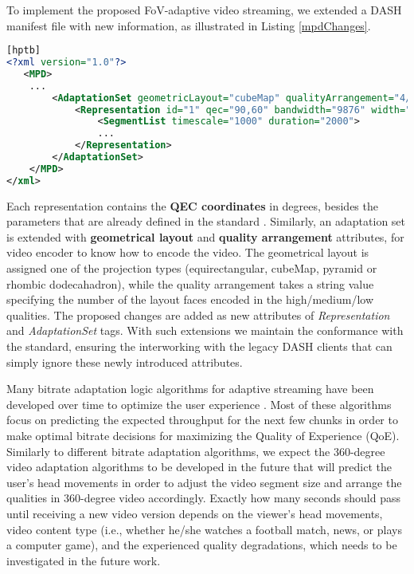  To implement the proposed FoV-adaptive video streaming, we extended a DASH manifest file with new information, as illustrated in Listing \ref{mpdChanges}.
\begin{lstlisting}[language=xml, frame=single, backgroundcolor=\color{white}, caption=Extensions of MPD file, label=mpdChanges][hptb]
<?xml version="1.0"?>
   <MPD>
    ...
        <AdaptationSet geometricLayout="cubeMap" qualityArrangement="4/1/1">
            <Representation id="1" qec="90,60" bandwidth="9876" width="1920" height="1080" frameRate="30">
                <SegmentList timescale="1000" duration="2000">
                ...
            </Representation>
        </AdaptationSet>
    </MPD>
</xml>
\end{lstlisting}
Each representation contains the \textbf{QEC coordinates} in degrees, besides the parameters that are already defined in the standard \cite{iso_iec}. Similarly, an adaptation set is extended with \textbf{geometrical layout} and \textbf{quality arrangement} attributes, for video encoder to know how to encode the video. The geometrical layout is assigned one of the projection types (equirectangular, cubeMap, pyramid or rhombic dodecahadron), while the quality arrangement takes a string value specifying the number of the layout faces encoded in the high/medium/low qualities. The proposed changes are added as new attributes of \textit{Representation} and \textit{AdaptationSet} tags. With such extensions we maintain the conformance with the standard, ensuring the interworking with the legacy DASH clients that can simply ignore these newly introduced attributes.


 Many bitrate adaptation logic algorithms for adaptive streaming have been developed over time to optimize the user experience \cite{tian}\cite{probe_li_2014}\cite{miller}\cite{zou}\cite{liu}. Most of these algorithms focus on predicting the expected throughput for the next few chunks in order to make optimal bitrate decisions for maximizing the Quality of Experience (QoE). Similarly to different bitrate adaptation algorithms, we expect the 360-degree video adaptation algorithms to be developed in the future that will predict the user's head movements in order to adjust the video segment size and arrange the qualities in 360-degree video accordingly. Exactly how many seconds should pass until receiving a new video version depends on the viewer's head movements, video content type (i.e., whether he/she watches a football match, news, or plays a computer game), and the experienced quality degradations, which needs to be investigated in the future work.%



